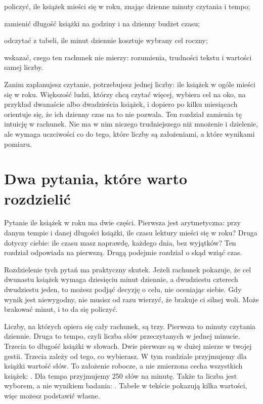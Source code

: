 
\begin{cele}
\item policzyć, ile książek mieści się w roku, znając dzienne minuty czytania i tempo;
\item zamienić długość książki na godziny i na dzienny budżet czasu;
\item odczytać z tabeli, ile minut dziennie kosztuje wybrany cel roczny;
\item wskazać, czego ten rachunek nie mierzy: rozumienia, trudności tekstu i wartości samej liczby.
\end{cele}

Zanim zaplanujesz czytanie, potrzebujesz jednej liczby: ile książek w ogóle mieści się w roku. Większość ludzi, którzy chcą czytać więcej, wybiera cel na oko, na przykład dwanaście albo dwadzieścia książek, i dopiero po kilku miesiącach orientuje się, że ich dzienny czas na to nie pozwala. Ten rozdział zamienia tę intuicję w rachunek. Nie ma w nim niczego trudniejszego niż mnożenie i dzielenie, ale wymaga uczciwości co do tego, które liczby są założeniami, a które wynikami pomiaru.

\section{Dwa pytania, które warto rozdzielić}

Pytanie \glqq ile książek w roku\grqq{} ma dwie części. Pierwsza jest arytmetyczna: przy danym tempie i danej długości książki, ile czasu lektury mieści się w roku? Druga dotyczy ciebie: ile czasu masz naprawdę, każdego dnia, bez wyjątków? Ten rozdział odpowiada na pierwszą. Drugą podejmie rozdział o skąd wziąć czas.

Rozdzielenie tych pytań ma praktyczny skutek. Jeżeli rachunek pokazuje, że cel dwunastu książek wymaga dziesięciu minut dziennie, a dwudziestu czterech dwudziestu jeden, to możesz podjąć decyzję o celu, nie oceniając siebie. Gdy wynik jest niewygodny, nie musisz od razu wierzyć, że brakuje ci silnej woli. Może brakować minut, i to da się policzyć.

Liczby, na których opiera się cały rachunek, są trzy. Pierwsza to minuty czytania dziennie. Druga to tempo, czyli liczba słów przeczytanych w jednej minucie. Trzecia to długość książki w słowach. Dwie pierwsze są w dużej mierze w twojej gestii. Trzecia zależy od tego, co wybierasz. W tym rozdziale przyjmujemy dla książki wartość  słów. To założenie robocze, a nie zmierzona cecha wszystkich książek: . Dla tempa przyjmujemy 250 słów na minutę. Także ta liczba jest wyborem, a nie wynikiem badania: . Tabele w tekście pokazują kilka wartości, więc możesz podstawić własne.

